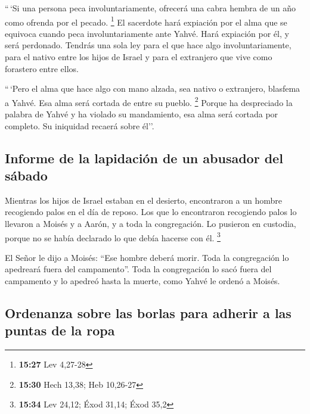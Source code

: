 \begin{paracol}{2}
 ``\,`Si una persona peca involuntariamente, ofrecerá una
cabra hembra de un año como ofrenda por el pecado. \footnote{\textbf{15:27}
  Lev 4,27-28}  El sacerdote hará expiación por el alma
que se equivoca cuando peca involuntariamente ante Yahvé. Hará expiación
por él, y será perdonado.  Tendrás una sola ley para el
que hace algo involuntariamente, para el nativo entre los hijos de
Israel y para el extranjero que vive como forastero entre ellos.

 ``\,`Pero el alma que hace algo con mano alzada, sea
nativo o extranjero, blasfema a Yahvé. Esa alma será cortada de entre su
pueblo. \footnote{\textbf{15:30} Hech 13,38; Heb 10,26-27}
 Porque ha despreciado la palabra de Yahvé y ha violado
su mandamiento, esa alma será cortada por completo. Su iniquidad recaerá
sobre él''.

\hypertarget{informe-de-la-lapidaciuxf3n-de-un-abusador-del-suxe1bado}{%
\subsection{Informe de la lapidación de un abusador del
sábado}\label{informe-de-la-lapidaciuxf3n-de-un-abusador-del-suxe1bado}}

 Mientras los hijos de Israel estaban en el desierto,
encontraron a un hombre recogiendo palos en el día de reposo.
 Los que lo encontraron recogiendo palos lo llevaron a
Moisés y a Aarón, y a toda la congregación.  Lo pusieron
en custodia, porque no se había declarado lo que debía hacerse con él.
\footnote{\textbf{15:34} Lev 24,12; Éxod 31,14; Éxod 35,2}

 El Señor le dijo a Moisés: ``Ese hombre deberá morir.
Toda la congregación lo apedreará fuera del campamento''.
 Toda la congregación lo sacó fuera del campamento y lo
apedreó hasta la muerte, como Yahvé le ordenó a Moisés.

\hypertarget{ordenanza-sobre-las-borlas-para-adherir-a-las-puntas-de-la-ropa}{%
\subsection{Ordenanza sobre las borlas para adherir a las puntas de la
ropa}\label{ordenanza-sobre-las-borlas-para-adherir-a-las-puntas-de-la-ropa}}


\end{paracol}
